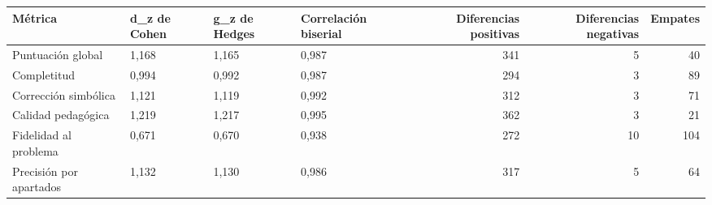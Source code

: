 \begin{tabular}{llllrrr}
\toprule
Métrica & d\_z de Cohen & g\_z de Hedges & Correlación biserial & Diferencias positivas & Diferencias negativas & Empates \\
\midrule
Puntuación global & 1,168 & 1,165 & 0,987 & 341 & 5 & 40 \\
Completitud & 0,994 & 0,992 & 0,987 & 294 & 3 & 89 \\
Corrección simbólica & 1,121 & 1,119 & 0,992 & 312 & 3 & 71 \\
Calidad pedagógica & 1,219 & 1,217 & 0,995 & 362 & 3 & 21 \\
Fidelidad al problema & 0,671 & 0,670 & 0,938 & 272 & 10 & 104 \\
Precisión por apartados & 1,132 & 1,130 & 0,986 & 317 & 5 & 64 \\
\bottomrule
\end{tabular}
